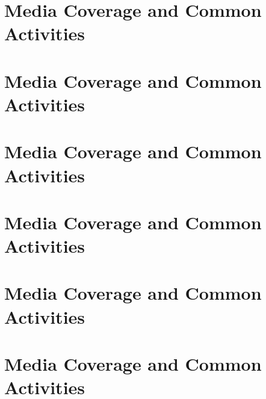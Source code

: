 


\chapter*{\huge Media Coverage and Common Activities}

\pagebreak
\chapter*{\huge Media Coverage and Common Activities}


\pagebreak
\chapter*{\huge Media Coverage and Common Activities}


\pagebreak
\chapter*{\huge Media Coverage and Common Activities}


\pagebreak
\chapter*{\huge Media Coverage and Common Activities}


\pagebreak
\chapter*{\huge Media Coverage and Common Activities}


